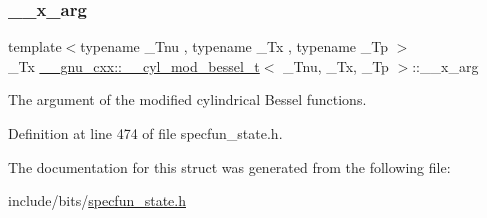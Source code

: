 \subsubsection{\texorpdfstring{\+\_\+\+\_\+x\+\_\+arg}{\_\_x\_arg}}
{\footnotesize\ttfamily template$<$typename \+\_\+\+Tnu , typename \+\_\+\+Tx , typename \+\_\+\+Tp $>$ \\
\+\_\+\+Tx \hyperlink{struct____gnu__cxx_1_1____cyl__mod__bessel__t}{\+\_\+\+\_\+gnu\+\_\+cxx\+::\+\_\+\+\_\+cyl\+\_\+mod\+\_\+bessel\+\_\+t}$<$ \+\_\+\+Tnu, \+\_\+\+Tx, \+\_\+\+Tp $>$\+::\+\_\+\+\_\+x\+\_\+arg}



The argument of the modified cylindrical Bessel functions. 



Definition at line 474 of file specfun\+\_\+state.\+h.



The documentation for this struct was generated from the following file\+:\begin{DoxyCompactItemize}
\item 
include/bits/\hyperlink{specfun__state_8h}{specfun\+\_\+state.\+h}\end{DoxyCompactItemize}
